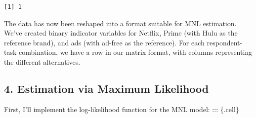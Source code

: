 \documentclass[
  letterpaper,
  DIV=11,
  numbers=noendperiod]{scrartcl}
\begin{document}
\begin{verbatim}
[1] 1
\end{verbatim}

The data has now been reshaped into a format suitable for MNL
estimation. We've created binary indicator variables for Netflix, Prime
(with Hulu as the reference brand), and ads (with ad-free as the
reference). For each respondent-task combination, we have a row in our
matrix format, with columns representing the different alternatives.

\subsection{4. Estimation via Maximum
Likelihood}\label{estimation-via-maximum-likelihood}

First, I'll implement the log-likelihood function for the MNL model: :::
\{.cell\}
\end{document}
